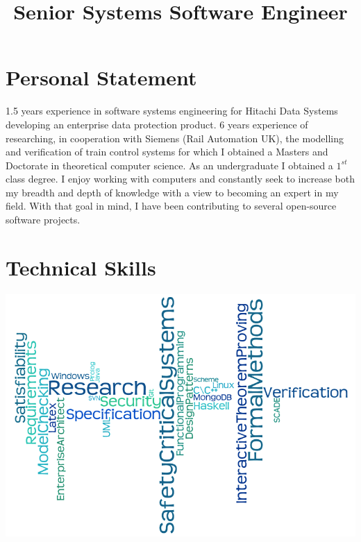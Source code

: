 \documentclass[11pt,a4paper,sans]{moderncv}
\title{Senior Systems Software Engineer}
\begin{document}
\makecvtitle

\section{Personal Statement}
1.5 years experience in software systems engineering for Hitachi Data Systems developing an enterprise data protection product. 6 years experience of researching, in cooperation with Siemens (Rail Automation UK), the modelling and verification of train control systems for which I obtained a Masters and Doctorate in theoretical computer science. As an undergraduate I obtained a $1^{st}$ class degree.  I enjoy working with computers and constantly seek to increase both my breadth and depth of knowledge with a view to becoming an expert in my field. With that goal in mind, I have been contributing to several open-source software projects.
\section{Technical Skills}
\begin{center}
\includegraphics[scale = 0.5]{wordle}
\end{center}
\newpage
\end{document}
